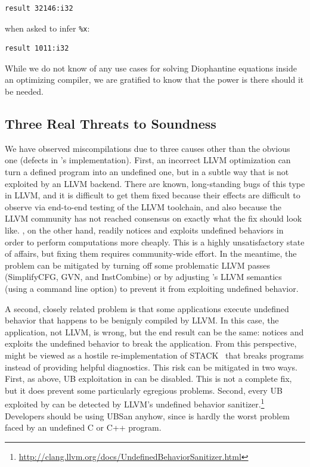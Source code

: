 {\small\begin{verbatim}
result 32146:i32
\end{verbatim}}
\noindent

\noindent
when asked to infer \texttt{\%x}:

{\small\begin{verbatim}
result 1011:i32
\end{verbatim}}

While we do not know of any use cases for solving Diophantine
equations inside an optimizing compiler, we are gratified to know that
the power is there should it be needed.


\subsection{Three Real Threats to Soundness}
\label{sec:threats}

We have observed miscompilations due to three causes other than the
obvious one (defects in \tool's implementation).
%
First, an incorrect LLVM optimization can turn a defined program into
an undefined one, but in a subtle way that is not exploited by an LLVM
backend.
%
There are known, long-standing bugs of this type in LLVM, and it is
difficult to get them fixed because their effects are difficult to
observe via end-to-end testing of the LLVM toolchain, and also because
the LLVM community has not reached consensus on exactly what the fix
should look like.
%
\tool{}, on the other hand, readily notices and exploits undefined
behaviors in order to perform computations more cheaply.
%
This is a highly unsatisfactory state of affairs, but fixing them
requires community-wide effort.
%
In the meantime, the problem can be mitigated by turning off some
problematic LLVM passes (SimplifyCFG, GVN, and InstCombine) or by
adjusting \tool{}'s LLVM semantics (using a command line option) to
prevent it from exploiting undefined behavior.


A second, closely related problem is that some applications
execute undefined behavior that happens to be benignly compiled by
LLVM\@.
%
In this case, the application, not LLVM, is wrong, but the end result
can be the same: \tool{} notices and exploits the undefined behavior
to break the application.
%
From this perspective, \tool{} might be viewed as a hostile
re-implementation of STACK~\cite{Wang13} that breaks programs instead
of providing helpful diagnostics.
%
This risk can be mitigated in two ways.
%
First, as above, UB exploitation in \tool{} can be disabled.
%
This is not a complete fix, but it does prevent some
particularly egregious problems.
%
Second, every UB exploited by \tool{} can be detected by LLVM's
undefined behavior
sanitizer.\footnote{\url{http://clang.llvm.org/docs/UndefinedBehaviorSanitizer.html}}
%
Developers should be using UBSan anyhow, since \tool{} is hardly the
worst problem faced by an undefined C or C++ program.


